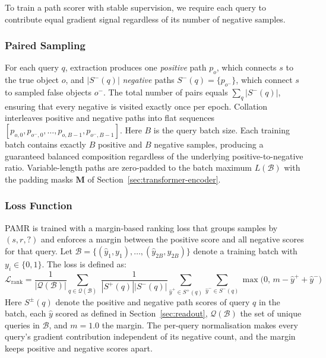 \documentclass[runningheads]{llncs}
\begin{document}
\label{sec:training}

To train a path scorer with stable supervision, we require each query to
contribute equal gradient signal regardless of its number of negative
samples.
\subsubsection{Paired Sampling}
\label{sec:paired-sampling}

For each query $q$, extraction produces one
\textit{positive} path $p_o$, which connects $s$ to the
true object $o$, and $|S^-(q)|$ \textit{negative} paths
$S^-(q) = \{p_{o^-}\}$, which connect
$s$ to sampled false objects $o^-$. The total number of pairs equals
$\sum_q |S^-(q)|$, ensuring that every negative is visited exactly
once per epoch. Collation interleaves positive and negative paths
into flat sequences
$[p_{o,0}, p_{o^-,0}, \ldots, p_{o,B-1}, p_{o^-,B-1}]$.
Here $B$ is the query batch size. Each training batch contains
exactly $B$ positive and $B$ negative samples, producing a guaranteed
balanced composition regardless of the underlying positive-to-negative
ratio. Variable-length paths are zero-padded to the batch maximum
$L(\mathcal{B})$ with the padding masks $\mathbf{M}$ of
Section~\ref{sec:transformer-encoder}.

\subsubsection{Loss Function}
\label{sec:loss-functions}

PAMR is trained with a margin-based ranking loss that groups samples
by $(s, r, ?)$ and enforces a margin between the positive score
and all negative scores for that query. Let $\mathcal{B} = \{(\hat{y}_1, y_1), \ldots, (\hat{y}_{2B}, y_{2B})\}$
denote a training batch with $y_i \in \{0, 1\}$. The loss is defined as:
\begin{equation}
  \mathcal{L}_{\text{rank}} = \frac{1}{|\mathcal{Q}(\mathcal{B})|} \sum_{q \in \mathcal{Q}(\mathcal{B})}\; \frac{1}{|S^+(q)||S^-(q)|} \sum_{\hat{y}^+ \in S^+(q)} \sum_{\hat{y}^- \in S^-(q)}
  \max\bigl(0,\, m - \hat{y}^+ + \hat{y}^-\bigr)
  \label{eq:loss-rank}
\end{equation}
Here $S^{\pm}(q)$ denote the positive and negative path scores of query
$q$ in the batch, each $\hat{y}$ scored as defined in
Section~\ref{sec:readout}, $\mathcal{Q}(\mathcal{B})$ the set of unique
queries in $\mathcal{B}$, and $m = 1.0$ the margin. The per-query
normalisation makes every query's gradient contribution independent of
its negative count, and the margin keeps positive and negative scores
apart.
\end{document}

